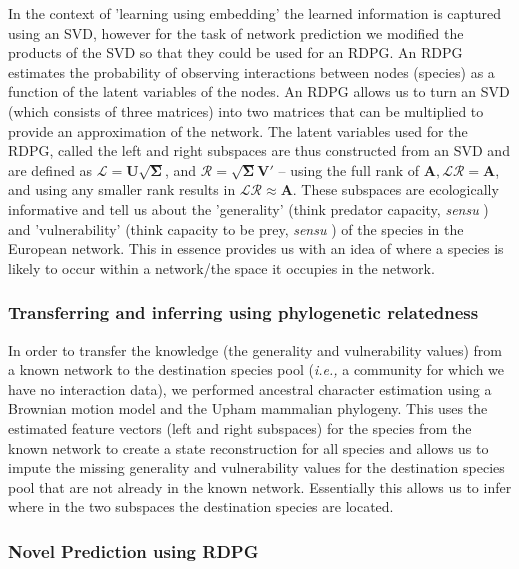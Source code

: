 In the context of 'learning using embedding' the learned information is captured using an SVD, however for the task of network prediction we modified the products of the SVD so that they could be used for an RDPG. An RDPG  estimates the probability of observing interactions between nodes (species) as a function of the latent variables of the nodes. An RDPG allows us to turn an SVD (which consists of three matrices) into two matrices that can be multiplied to provide an approximation of the network. The latent variables used for the RDPG, called the left and right subspaces are thus constructed from an SVD and are defined as $\mathscr{L} = \mathbf{U}\sqrt{\mathbf{\Sigma}}$, and $\mathscr{R} = \sqrt{\mathbf{\Sigma}}\mathbf{V}'$ -- using the full rank of $\mathbf{A}, \mathscr{L}\mathscr{R} = \mathbf{A}$, and using any smaller rank results in $\mathscr{L}\mathscr{R} \approx \mathbf{A}$. These subspaces are ecologically informative and tell us about the 'generality' (think predator capacity, \emph{sensu} \cite{Schoener1989FooWeb}) and  'vulnerability' (think capacity to be prey, \emph{sensu} \cite{Schoener1989FooWeb}) of the species in the European network. This in essence provides us with an idea of where a species is likely to occur within a network/the space it occupies in the network.

\subsubsection{Transferring and inferring using phylogenetic relatedness}

In order to transfer the knowledge (the generality and vulnerability values) from a known network to the destination species pool (\emph{i.e.,} a community for which we have no interaction data), we performed ancestral character estimation using a Brownian motion model and the Upham \cite{Upham2019InfMam} mammalian phylogeny. This uses the estimated feature vectors (left and right subspaces) for the species from the known network to create a state reconstruction for all species and allows us to impute the missing generality and vulnerability values for the destination species pool that are not already in the known network. Essentially this allows us to infer where in the two subspaces the destination species are located.

\subsubsection{Novel Prediction using RDPG}

